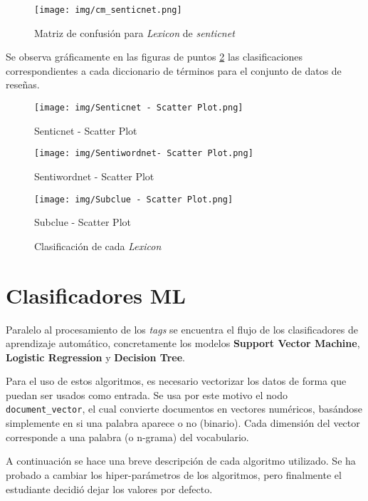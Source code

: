 \documentclass[12pt,letterpaper]{article}
\begin{document}
\begin{figure}[htp]
    \centering
    \texttt{[image: img/cm\_senticnet.png]}
    \caption{Matriz de confusión para \textit{Lexicon} de \textit{senticnet}}
    \label{fig:cm_senticnet}
\end{figure}

Se observa gráficamente en las figuras de puntos \ref{fig:scatter} las clasificaciones correspondientes a cada diccionario de términos para el conjunto de datos de reseñas.

\begin{figure}[htp]
    \centering
    \begin{minipage}{0.45\textwidth}
        \centering
        \texttt{[image: img/Senticnet - Scatter Plot.png]}
        \caption{Senticnet - Scatter Plot}
    \end{minipage}
    \hfill
    \begin{minipage}{0.45\textwidth}
        \centering
        \texttt{[image: img/Sentiwordnet- Scatter Plot.png]}
        \caption{Sentiwordnet - Scatter Plot}
    \end{minipage}

    \begin{minipage}{0.6\textwidth}
        \centering
        \texttt{[image: img/Subclue - Scatter Plot.png]}
        \caption{Subclue - Scatter Plot}
    \end{minipage}
    \caption{Clasificación de cada \textit{Lexicon}}
    \label{fig:scatter}
\end{figure}

\section{Clasificadores ML}
Paralelo al procesamiento de los \textit{tags} se encuentra el flujo de los clasificadores de aprendizaje automático, concretamente los modelos \textbf{Support Vector Machine}, \textbf{Logistic Regression} y \textbf{Decision Tree}.

Para el uso de estos algoritmos, es necesario vectorizar los datos de forma que puedan ser usados como entrada. Se usa por este motivo el nodo \texttt{document\_vector}, el cual convierte documentos en vectores numéricos, basándose simplemente en si una palabra aparece o no (binario). Cada dimensión del vector corresponde a una palabra (o n-grama) del vocabulario.

A continuación se hace una breve descripción de cada algoritmo utilizado. Se ha probado a cambiar los hiper-parámetros de los algoritmos, pero finalmente el estudiante decidió dejar los valores por defecto.
\end{document}
